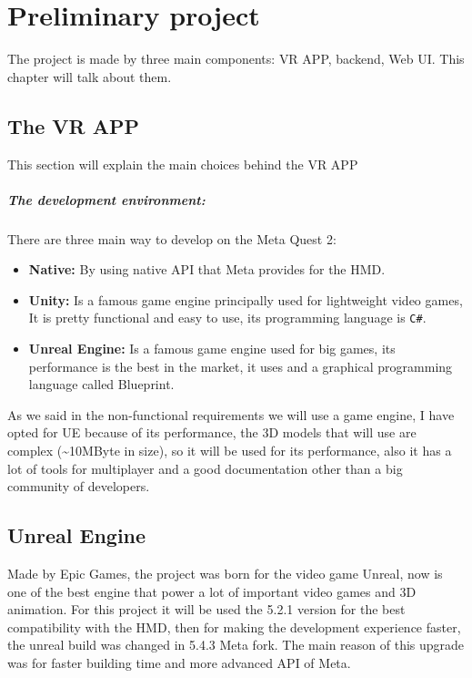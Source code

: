 
\chapter{Preliminary project}
\noindent
The project is made by three main components: \ac{VR} APP, backend, Web \ac{UI}. This chapter will talk about them.
\section{The VR APP}
\noindent
This section will explain the main choices behind the \ac{VR} APP
\paragraph{The development environment:} 
There are three main way to develop on the Meta Quest 2:

\begin{itemize}
  \item \textbf{Native:} By using native \ac{API} that Meta provides for the \ac{HMD}.
  \item \textbf{Unity:} Is a famous game engine principally used for lightweight video games, It is pretty functional and easy to use, its programming language is \verb|C#|. 
  \item \textbf{Unreal Engine:} Is a famous game engine used for big games, its performance is the best in the market, it uses \cpp and a graphical programming language called Blueprint. 
\end{itemize}
\noindent
As we said in the non-functional requirements we will use a game engine, I have opted for \ac{UE} because of its performance, the 3D models that will use are complex (\textasciitilde10MByte in size),
so it will be used for its performance, also it has a lot of tools for multiplayer and a good documentation other than a big community of developers.

\section{Unreal Engine}
\noindent
Made by Epic Games, the project was born for the video game Unreal, now is one of the best engine that power a lot of important video games and 3D animation.
For this project it will be used the 5.2.1 version for the best compatibility with the \ac{HMD}, then for making the development experience faster, the unreal build was changed in 5.4.3 Meta fork.
The main reason of this upgrade was for faster building time and more advanced \ac{API} of Meta.

